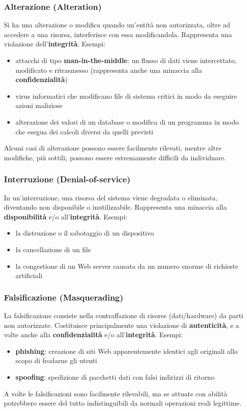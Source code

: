 \subsubsection{Alterazione (Alteration)}
Si ha una alterazione o modifica quando un'entità non autorizzata, oltre ad accedere a una risorsa, interferisce con essa modificandola. Rappresenta una violazione dell'\textbf{integrità}. Esempi:
\begin{itemize} 
  \item attacchi di tipo \textbf{man-in-the-middle}: un flusso di dati viene intercettato, modificato e ritrasmesso (rappresenta anche una minaccia alla \textbf{confidenzialità})
  \item virus informatici che modificano file di sistema critici in modo da eseguire azioni maliziose
  \item alterazione dei valori di un database o modifica di un programma in modo che esegua dei calcoli diversi da quelli previsti
\end{itemize}
Alcuni casi di alterazione possono essere facilmente rilevati, mentre altre modifiche, più sottili, possono essere estremamente difficili da individuare.

\subsubsection{Interruzione (Denial-of-service)}
In un’interruzione, una risorsa del sistema viene degradata o eliminata, diventando non disponibile o inutilizzabile. Rappresenta una minaccia alla \textbf{disponibilità} e/o all'\textbf{integrità}. Esempi:
\begin{itemize} 
  \item la distruzione o il sabotaggio di un dispositivo
  \item la cancellazione di un file
  \item la congestione di un Web server causata da un numero enorme di richieste artificiali
\end{itemize}

\subsubsection{Falsificazione (Masquerading)}
La falsificazione consiste nella contraffazione di risorse (dati/hardware) da parti non autorizzate. Costituisce principalmente una violazione di \textbf{autenticità}, e a volte anche alla \textbf{confidenzialità} e/o all'\textbf{integrità}. Esempi:
\begin{itemize} 
  \item \textbf{phishing}: creazione di siti Web apparentemente identici agli originali allo scopo di frodarne gli utenti
  \item \textbf{spoofing}: spedizione di pacchetti dati con falsi indirizzi di ritorno
\end{itemize}
A volte le falsificazioni sono facilmente rilevabili, ma se attuate con abilità potrebbero essere del tutto indistinguibili da normali operazioni reali legittime.

